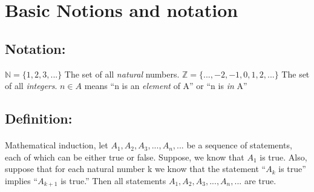 \documentclass[hidelinks,12pt]{article}
\begin{document}
\begin{titlepage}
	
	\vfill\vfill\vfill %
	
	{\large{}} %
	
	
	 
	
	\vfill %
	
\end{titlepage}
\tableofcontents
\newpage
\section{Basic Notions and notation}
\subsection{Notation:}
$\mathbb{N} = \{1,2,3,...\}$ The set of all \emph{natural} numbers.
\newline $\mathbb{Z} = \{...,-2,-1,0,1,2,...\}$ The set of all \emph{integers}.
\newline $n \in A$ means ``n is an \emph{element} of A'' or ``n is \emph{in} A''
\subsection{Definition:}
\paragraph{}
Mathematical induction, let $A_1,A_2,A_3,...,A_n,...$ be a sequence of statements, each of which can be either true or false. Suppose, we know that $A_1$ is true. Also, suppose that for each natural number k we
know that the statement ``$A_k$ is true'' implies ``$A_{k+1}$ is true.'' Then all statements $A_1,A_2,A_3,...,A_n,...$ are true.
\end{document}
